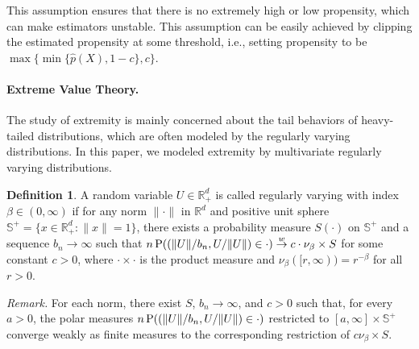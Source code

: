 \documentclass[12pt]{article}
\theoremstyle{plain}
\theoremstyle{definition}
\newtheorem{definition}[theorem]{Definition}
\begin{document}
This assumption ensures that there is no extremely high or low propensity, which can make estimators unstable. This assumption can be easily achieved by clipping the estimated propensity at some threshold, i.e., setting propensity to be $ \max\{\min\{\hat{p}(X), 1 -c\}, c\} $. 

\paragraph{Extreme Value Theory.} The study of extremity is mainly concerned about the tail behaviors of heavy-tailed distributions, which are often modeled by the regularly varying distributions. In this paper, we modeled extremity by multivariate regularly varying distributions. 

\begin{definition} \label{def:mvarying}
  A random variable $U \in \mathbb{R}^d_+$ is called regularly varying with index $\beta \in (0, \infty)$ if for any norm $\| \cdot \|$ in
  $\mathbb{R}^d$ and positive unit sphere $\mathbb{S}^+ = \{ x \in
  \mathbb{R}^d_+ : \| x \| = 1 \}$, there exists a probability measure $S
  (\cdot)$ on $\mathbb{S}^+$ and a sequence $b_n \rightarrow \infty$ such that $n\operatorname{P} ((\| U \| / b_n, U / \| U \|) \in \cdot) \overset{w}{\rightarrow} c \cdot \nu_{\beta} \times S$ for some constant $c > 0$, where $\cdot\times \cdot$ is the product measure and $\nu_{\beta} ([r, \infty)) = r^{-\beta}$ for all $r > 0$.
\end{definition}

\noindent\textit{Remark.} For each norm, there exist $S$, $b_n\rightarrow\infty$, and $c>0$ such that, for every $a>0$, the polar measures $n\operatorname{P}((\|U\|/b_n,U/\|U\|)\in\cdot)$ restricted to $[a,\infty]\times\mathbb{S}^+$ converge weakly as finite measures to the corresponding restriction of $c\nu_\beta\times S$.
\end{document}
